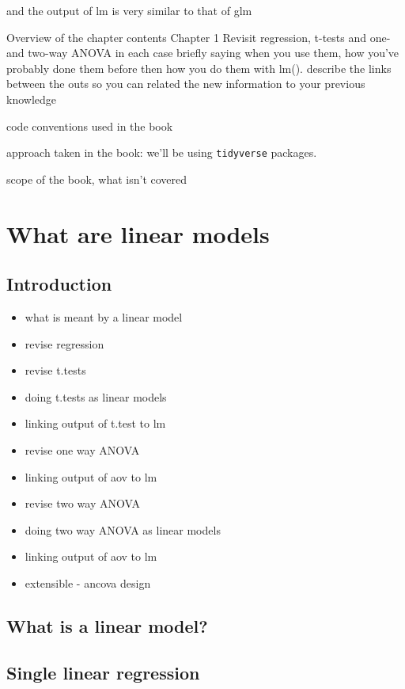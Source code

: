 \documentclass[
]{book}
\providecommand{\tightlist}{%
  \setlength{\itemsep}{0pt}\setlength{\parskip}{0pt}}
\begin{document}
and the output of lm is very similar to that of glm

Overview of the chapter contents
Chapter 1
Revisit regression, t-tests and one- and two-way ANOVA in each case briefly saying when you use them, how you've probably done them before then how you do them with lm(). describe the links between the outs so you can related the new information to your previous knowledge

code conventions used in the book

approach taken in the book:
we'll be using \texttt{tidyverse} \citep{tidyverse2019} packages.

scope of the book, what isn't covered

\hypertarget{revisit}{%
\chapter{What are linear models}\label{revisit}}

\hypertarget{introduction}{%
\section{Introduction}\label{introduction}}

\begin{itemize}
\tightlist
\item
  what is meant by a linear model
\item
  revise regression
\item
  revise t.tests
\item
  doing t.tests as linear models
\item
  linking output of t.test to lm
\item
  revise one way ANOVA
\item
  linking output of aov to lm
\item
  revise two way ANOVA
\item
  doing two way ANOVA as linear models
\item
  linking output of aov to lm
\item
  extensible - ancova design
\end{itemize}

\hypertarget{what-is-a-linear-model}{%
\section{What is a linear model?}\label{what-is-a-linear-model}}

\hypertarget{single-linear-regression}{%
\section{Single linear regression}\label{single-linear-regression}}
\end{document}
